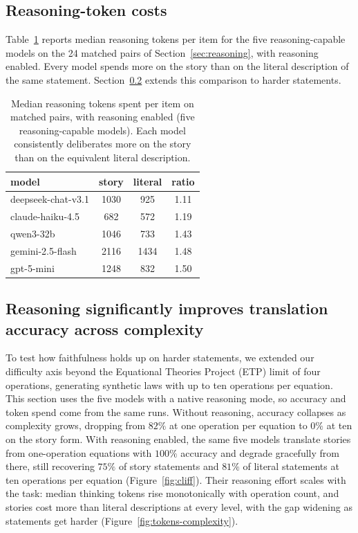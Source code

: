 \documentclass{article}
\begin{document}
\subsection{Reasoning-token costs}
\label{sec:tokens}

Table~\ref{tab:tokens} reports median reasoning tokens per item for the five
reasoning-capable models on the 24 matched pairs of Section~\ref{sec:reasoning},
with reasoning enabled. Every model spends more on the story than on the
literal description of the same statement. Section~\ref{sec:complexity}
extends this comparison to harder statements.

\begin{table}[H]
\centering
\caption{Median reasoning tokens spent per item on matched pairs, with
reasoning enabled (five reasoning-capable models). Each model consistently
deliberates more on the story than on the equivalent literal description.}
\label{tab:tokens}
\begin{tabular}{lccc}
\toprule
model & story & literal & ratio \\
\midrule
deepseek-chat-v3.1 & 1030 & 925 & 1.11 \\
claude-haiku-4.5 & 682 & 572 & 1.19 \\
qwen3-32b & 1046 & 733 & 1.43 \\
gemini-2.5-flash & 2116 & 1434 & 1.48 \\
gpt-5-mini & 1248 & 832 & 1.50 \\
\bottomrule
\end{tabular}
\end{table}



\subsection{Reasoning significantly improves translation accuracy across complexity}
\label{sec:complexity}

To test how faithfulness holds up on harder statements, we extended our difficulty axis beyond the Equational Theories Project (ETP) limit of four operations, generating synthetic laws with up to ten operations per equation. This section uses the five models with a native reasoning mode, so accuracy and token spend come from the same runs. Without reasoning, accuracy collapses as complexity grows, dropping from $82\%$ at one operation per equation to $0\%$ at ten on the story form. With reasoning enabled, the same five models translate stories from one-operation equations with $100\%$ accuracy and degrade gracefully from there, still recovering $75\%$ of story statements and $81\%$ of literal statements at ten operations per equation (Figure~\ref{fig:cliff}). Their reasoning effort scales with the task: median thinking tokens rise monotonically with operation count, and stories cost more than literal descriptions at every level, with the gap widening as statements get harder (Figure~\ref{fig:tokens-complexity}). 
\end{document}
